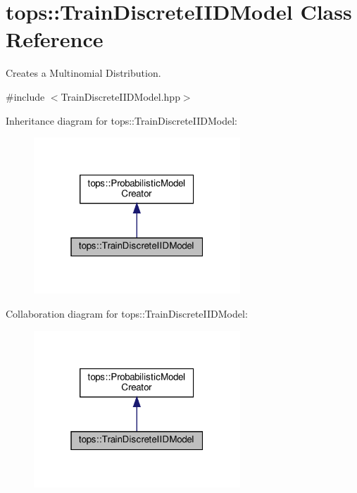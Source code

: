 \hypertarget{classtops_1_1TrainDiscreteIIDModel}{}\section{tops\+:\+:Train\+Discrete\+I\+I\+D\+Model Class Reference}
\label{classtops_1_1TrainDiscreteIIDModel}


Creates a Multinomial Distribution.  




{\ttfamily \#include $<$Train\+Discrete\+I\+I\+D\+Model.\+hpp$>$}



Inheritance diagram for tops\+:\+:Train\+Discrete\+I\+I\+D\+Model\+:
\nopagebreak
\begin{figure}[H]
\begin{center}
\leavevmode
\includegraphics[width=220pt]{classtops_1_1TrainDiscreteIIDModel__inherit__graph}
\end{center}
\end{figure}


Collaboration diagram for tops\+:\+:Train\+Discrete\+I\+I\+D\+Model\+:
\nopagebreak
\begin{figure}[H]
\begin{center}
\leavevmode
\includegraphics[width=220pt]{classtops_1_1TrainDiscreteIIDModel__coll__graph}
\end{center}
\end{figure}
